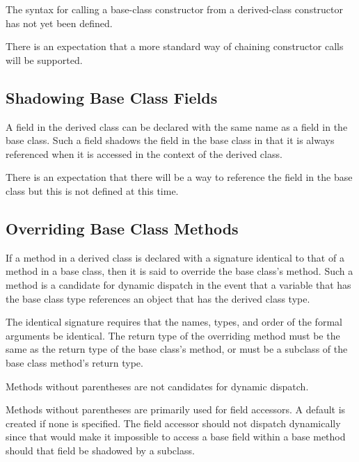 \begin{openissue}
The syntax for calling a base-class constructor from a derived-class constructor
has not yet been defined.

There is an expectation that a more standard way
of chaining constructor calls will be supported.
\end{openissue}

\subsection{Shadowing Base Class Fields}
\label{Shadowing_Base_Class_Fields}
A field in the derived class can be declared with the same name as a
field in the base class.  Such a field shadows the field in the base
class in that it is always referenced when it is accessed in the
context of the derived class.  

\begin{openissue}
There is an expectation that there will
be a way to reference the field in the base class but this is not
defined at this time.
\end{openissue}

\subsection{Overriding Base Class Methods}
\label{Overriding_Base_Class_Methods}

If a method in a derived class is declared with a
signature identical to that of a method in a base class, then it is said to override the
base class's method.  Such a method is a candidate for dynamic
dispatch in the event that a variable that has the base class type
references an object that has the derived class type.

The identical signature requires that the names, types, and order of
the formal arguments be identical. The return type of the overriding
method must be the same as the return type of the base class's method,
or must be a subclass of the base class method's return type.

Methods without parentheses are not candidates for dynamic dispatch.
\begin{rationale}
Methods without parentheses are primarily used for field accessors.  
A default is created if none is specified.  The field accessor
should not dispatch dynamically since that would make it
impossible to access a base field within a base method should that
field be shadowed by a subclass.
\end{rationale}

